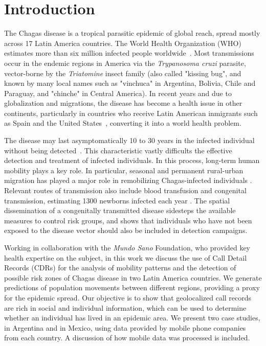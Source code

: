 \section{Introduction}

The Chagas disease is a tropical parasitic epidemic of global reach, spread mostly across 17 Latin America countries. The World Health Organization (WHO) estimates more than six million infected people worldwide~\cite{who2016}. Most transmissions occur in the endemic regions in America via the \textit{Trypanosoma cruzi} parasite, vector-borne by the \textit{Triatomine} insect family (also called "kissing bug", and known by many local names such as "vinchuca" in Argentina, Bolivia, Chile and Paraguay, and "chinche" in Central America). In recent years and due to globalization and migrations, the disease has become a health issue in other continents, particularly in countries who receive Latin American inmigrants such as Spain and the United States~\cite{schmunis2010chagas}, converting it into a world health problem.

The disease may last asymptomatically 10 to 30 years in the infected individual without being detected~\cite{rassi2012american}. This characteristic vastly difficults the effective detection and treatment of infected individuals. In this process, long-term human mobility plays a key role. In particular, seasonal and permanent rural-urban migration has played a major role in remobilizing Chagas-infected individuals \cite{briceno2009chagas}. 
Relevant routes of transmission also include blood transfusion and congenital transmission, estimating 1300 newborns infected each year \cite{OPS2006chagas}.
The spatial dissemination of a congenitally transmitted disease sidesteps the available measures to control risk groups, and shows that individuals who have not been exposed to the disease vector should also be included in detection campaigns.

Working in collaboration with the \textit{Mundo Sano} Foundation, who provided key health expertise on the subject, in this work we discuss the use of Call Detail Records (CDRs) for the analysis of mobility patterns and the detection of possible risk zones of Chagas disease in two Latin America countries. We generate predictions of population movements between different regions, providing a proxy for the epidemic spread. Our objective is to show that geolocalized call records are rich in social and individual information, which can be used to determine whether an individual has lived in an epidemic area. We present two case studies, in Argentina and in Mexico, using data provided by mobile phone companies from each country. A discussion of how mobile data was processed is included. 

